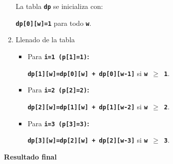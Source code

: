 \begin{enumerate}[label=\color{red}\textbf{\arabic*)}]
\begin{enumerate}[label=Paso \arabic*:]
      La tabla \textbf{\texttt{dp}} se inicializa con: 
      \begin{center}
        \textbf{\texttt{dp[0][w]=1}} para todo \textbf{\texttt{w}}. 
      \end{center}
    \item Llenado de la tabla
      \begin{itemize}[label=\textbullet]
        \item Para \textbf{\texttt{i=1 (p[1]=1)}:}
          \begin{center}
            \textbf{\texttt{dp[1][w]=dp[0][w] + dp[0][w-1]}} si \textbf{\texttt{w $\ge $ 1}}.  
          \end{center}
        \item Para \textbf{\texttt{i=2 (p[2]=2)}:}
          \begin{center}
            \textbf{\texttt{dp[2][w]=dp[1][w] + dp[1][w-2]}} si \textbf{\texttt{w $\ge $ 2}}.  
          \end{center}
        \item Para \textbf{\texttt{i=3 (p[3]=3)}:}
          \begin{center}
            \textbf{\texttt{dp[3][w]=dp[2][w] + dp[2][w-3]}} si \textbf{\texttt{w $\ge $ 3}}.  
          \end{center}
      \end{itemize}
  \end{enumerate}
  \textbf{Resultado final}


\end{enumerate}
